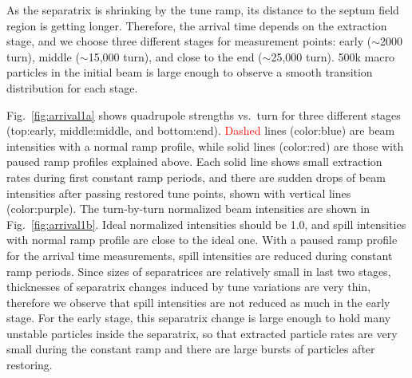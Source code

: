 \documentclass[aps,prstab,onecolumn,preprint]{revtex4-1}
\begin{document}
As the separatrix is shrinking by the tune ramp, its distance to the septum field region is getting longer. Therefore, the arrival time depends on the extraction stage, and we choose three different stages for measurement points: early ($\sim$2000 turn), middle ($\sim$15,000 turn), and close to the end ($\sim$25,000 turn). 500k macro particles in the initial beam is large enough to observe a smooth transition distribution for each stage.

Fig.~\ref{fig:arrival1a} shows quadrupole strengths vs.~turn for three different stages (top:early, middle:middle, and bottom:end). \textcolor{red}{Dashed} lines (color:blue) are beam intensities with a normal ramp profile, while solid lines (color:red) are those with paused ramp profiles explained above. Each solid line shows small extraction rates during first constant ramp periods, and there are sudden drops of beam intensities after passing restored tune points, shown with vertical lines (color:purple). The turn-by-turn normalized beam intensities are shown in Fig.~\ref{fig:arrival1b}. Ideal normalized intensities should be 1.0, and spill intensities with normal ramp profile are close to the ideal one. With a paused ramp profile for the arrival time measurements, spill intensities are reduced during constant ramp periods. Since sizes of separatrices are relatively small in last two stages, thicknesses of separatrix changes induced by tune variations are very thin, therefore we observe that spill intensities are not reduced as much in the early stage. For the early stage, this separatrix change is large enough to hold many unstable particles inside the separatrix, so that extracted particle rates are very small during the constant ramp and there are large bursts of particles after restoring. 
\end{document}
